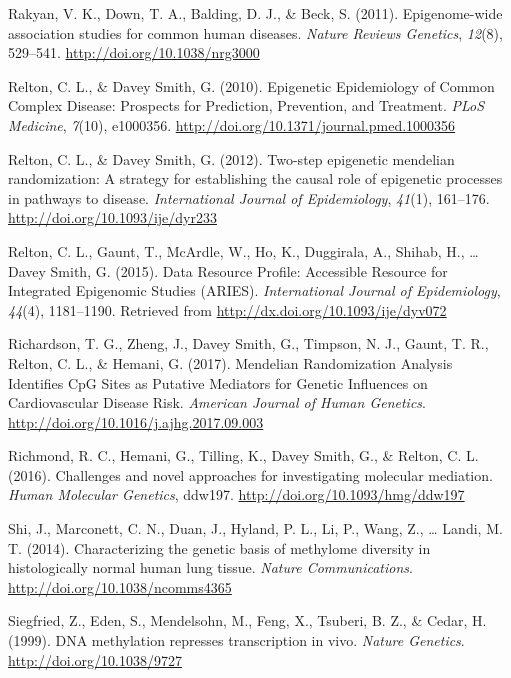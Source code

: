 \documentclass[11pt,twoside]{bristolthesis}
\newlength{\cslhangindent}
\newenvironment{cslreferences}%
  {\setlength{\parindent}{0pt}%
  \everypar{\setlength{\hangindent}{\cslhangindent}}\ignorespaces}%
  {\par}
\begin{document}
\begin{cslreferences}
\leavevmode\hypertarget{ref-Rakyan2011}{}%
Rakyan, V. K., Down, T. A., Balding, D. J., \& Beck, S. (2011). Epigenome-wide association studies for common human diseases. \emph{Nature Reviews Genetics}, \emph{12}(8), 529--541. \url{http://doi.org/10.1038/nrg3000}

\leavevmode\hypertarget{ref-Relton2010}{}%
Relton, C. L., \& Davey Smith, G. (2010). Epigenetic Epidemiology of Common Complex Disease: Prospects for Prediction, Prevention, and Treatment. \emph{PLoS Medicine}, \emph{7}(10), e1000356. \url{http://doi.org/10.1371/journal.pmed.1000356}

\leavevmode\hypertarget{ref-Relton2012}{}%
Relton, C. L., \& Davey Smith, G. (2012). Two-step epigenetic mendelian randomization: A strategy for establishing the causal role of epigenetic processes in pathways to disease. \emph{International Journal of Epidemiology}, \emph{41}(1), 161--176. \url{http://doi.org/10.1093/ije/dyr233}

\leavevmode\hypertarget{ref-Relton2015}{}%
Relton, C. L., Gaunt, T., McArdle, W., Ho, K., Duggirala, A., Shihab, H., \ldots{} Davey Smith, G. (2015). Data Resource Profile: Accessible Resource for Integrated Epigenomic Studies (ARIES). \emph{International Journal of Epidemiology}, \emph{44}(4), 1181--1190. Retrieved from \url{http://dx.doi.org/10.1093/ije/dyv072}

\leavevmode\hypertarget{ref-Richardson2017}{}%
Richardson, T. G., Zheng, J., Davey Smith, G., Timpson, N. J., Gaunt, T. R., Relton, C. L., \& Hemani, G. (2017). Mendelian Randomization Analysis Identifies CpG Sites as Putative Mediators for Genetic Influences on Cardiovascular Disease Risk. \emph{American Journal of Human Genetics}. \url{http://doi.org/10.1016/j.ajhg.2017.09.003}

\leavevmode\hypertarget{ref-Richmond2016}{}%
Richmond, R. C., Hemani, G., Tilling, K., Davey Smith, G., \& Relton, C. L. (2016). Challenges and novel approaches for investigating molecular mediation. \emph{Human Molecular Genetics}, ddw197. \url{http://doi.org/10.1093/hmg/ddw197}

\leavevmode\hypertarget{ref-Shi2014}{}%
Shi, J., Marconett, C. N., Duan, J., Hyland, P. L., Li, P., Wang, Z., \ldots{} Landi, M. T. (2014). Characterizing the genetic basis of methylome diversity in histologically normal human lung tissue. \emph{Nature Communications}. \url{http://doi.org/10.1038/ncomms4365}

\leavevmode\hypertarget{ref-Siegfried1999}{}%
Siegfried, Z., Eden, S., Mendelsohn, M., Feng, X., Tsuberi, B. Z., \& Cedar, H. (1999). DNA methylation represses transcription in vivo. \emph{Nature Genetics}. \url{http://doi.org/10.1038/9727}


\end{cslreferences}
\end{document}

